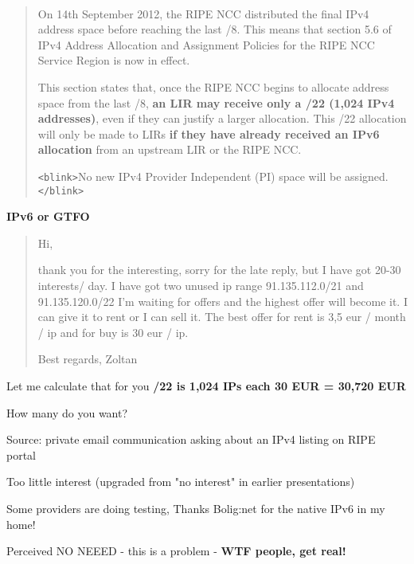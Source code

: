 \documentclass[28pt,landscape,a4paper,footrule]{foils}
\begin{document}

\\


\begin{quote}
On 14th September 2012, the RIPE NCC distributed the final IPv4 address space
before reaching the last /8. This means that section 5.6 of IPv4 Address
Allocation and Assignment Policies for the RIPE NCC Service Region is now in
effect.

This section states that, once the RIPE NCC begins to allocate address space
from the last /8, {\bf an LIR may receive only a /22 (1,024 IPv4 addresses)}, even
if they can justify a larger allocation. This /22 allocation will only be
made to LIRs {\bf if they have already received an IPv6 allocation} from an
upstream LIR or the RIPE NCC.

\vskip 1cm
\verb+<blink>+No new IPv4 Provider Independent (PI) space will be assigned.\verb+</blink>+
\end{quote}

\vskip 15mm

\centerline{\color{titlecolor}\bf \LARGE IPv6 or GTFO}



\begin{quote}
Hi,

thank you for the interesting, sorry for the late reply, but I have got
20-30 interests/ day. I have got two unused ip range 91.135.112.0/21 and
91.135.120.0/22 I'm waiting for offers and the highest offer will become
it. I can give it to rent or I can sell it. The best offer for rent is 3,5
eur / month / ip and for buy is 30 eur / ip.

Best regards,
Zoltan
\end{quote}

Let me calculate that for you {\bf /22 is 1,024 IPs each 30 EUR = 30,720 EUR}

How many do you want?

\vskip 2cm 
Source: private email communication asking about an IPv4 listing on RIPE portal



\begin{list1}
\item Too little interest (upgraded from "no interest" in earlier presentations)
\item Some providers are doing testing, Thanks Bolig:net for the native IPv6 in my home!
\item Perceived NO NEEED - this is a problem - {\bf WTF people, get real!}
\end{list1}
\end{document}
